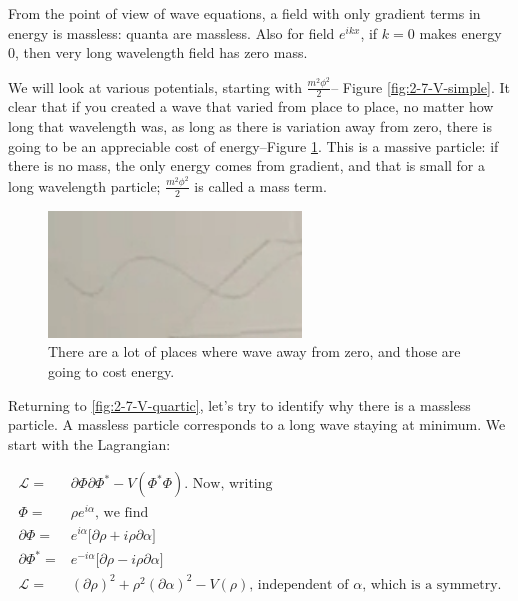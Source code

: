 \documentclass[]{article}
\begin{document}
 From the point of view of wave equations, a field with only gradient terms in energy is massless: quanta are massless. Also for field $e^{ikx}$, if $k=0$ makes energy $0$, then very long wavelength field has zero mass.
 
We will look at various potentials, starting with $\frac{m^2 \phi^2}{2}$--  Figure \ref{fig:2-7-V-simple}. It clear that if you created a wave that varied from place to place, no matter how long that wavelength was, as long as there is  variation away from zero, there is going to be an appreciable cost of energy--Figure \ref{fig:2-7-variation-from-zero}. This is a massive particle: if there is no mass, the only energy comes from gradient, and that is small for a long wavelength particle; $\frac{m^2 \phi^2}{2}$ is called a mass term.

\begin{figure}[H]
	\begin{center}
		\caption{There are a lot of places where wave away from zero, and those are going to cost energy.}\label{fig:2-7-variation-from-zero}
		\includegraphics[width=0.6\textwidth]{2-7-variation-from-zero}
	\end{center}
\end{figure}

Returning to \ref{fig:2-7-V-quartic}, let's try to identify why there is a massless particle. A massless particle corresponds to a long wave staying at minimum. We start with the Lagrangian:

\begin{align*}
	\mathcal{L} =& \partial \Phi \partial \Phi^* - V(\Phi^*\Phi) \text{. Now, writing}\\
	\Phi =& \rho e^{i \alpha} \text{, we find} \\
	\partial \Phi =& e^{i \alpha} \big[\partial \rho + i \rho \partial \alpha\big]\\
	\partial \Phi^* =& e^{-i \alpha} \big[\partial \rho - i \rho \partial \alpha\big]\\
	\mathcal{L} =& (\partial \rho)^2 + \rho^2  (\partial \alpha)^2 - V(\rho) \text{, independent of $\alpha$, which is a symmetry.} 
\end{align*}
\end{document}
